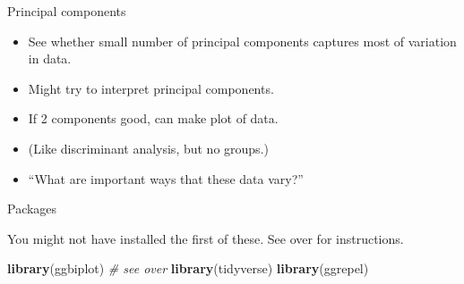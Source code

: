 \documentclass[
  ignorenonframetext,
]{beamer}
\newenvironment{Shaded}{\begin{snugshade}}{\end{snugshade}}
\newcommand{\CommentTok}[1]{\textcolor[rgb]{0.56,0.35,0.01}{\textit{#1}}}
\newcommand{\KeywordTok}[1]{\textcolor[rgb]{0.13,0.29,0.53}{\textbf{#1}}}
\newcommand{\NormalTok}[1]{#1}
\begin{document}
\begin{frame}{Principal components}
\protect\hypertarget{principal-components-2}{}

\begin{itemize}
\item
  See whether small number of principal components captures most of
  variation in data.
\item
  Might try to interpret principal components.
\item
  If 2 components good, can make plot of data.
\item
  (Like discriminant analysis, but no groups.)
\item
  ``What are important ways that these data vary?''
\end{itemize}

\end{frame}

\begin{frame}[fragile]{Packages}
\protect\hypertarget{packages-8}{}

You might not have installed the first of these. See over for
instructions.

\begin{Shaded}
\begin{Highlighting}[]
\KeywordTok{library}\NormalTok{(ggbiplot) }\CommentTok{# see over}
\KeywordTok{library}\NormalTok{(tidyverse)}
\KeywordTok{library}\NormalTok{(ggrepel)}
\end{Highlighting}
\end{Shaded}

\end{frame}
\end{document}
